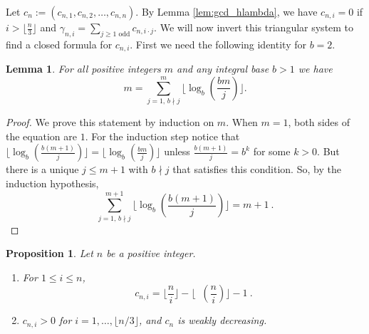 \documentclass[reqno]{amsart}
\def\e{\gamma}
\DeclareMathOperator{\lb}{\log_2}
\newtheorem{proposition}[theorem]{Proposition}
\newtheorem{lemma}[theorem]{Lemma}
\theoremstyle{definition}
\begin{document}
Let $c_n:=(c_{n,1},c_{n,2},\ldots,c_{n,n})$. By Lemma \ref{lem:gcd_hlambda}, we have  $c_{n,i}=0$ if $i>\lfloor \frac{n}{3}\rfloor$ and $\e_{n,i}=\sum_{j\geq 1 \textrm{ odd}}c_{n,i\cdot j}$. We will now invert this triangular system to find a  closed formula for $c_{n,i}$. First we  need the following identity for $b=2$. 




\begin{lemma} \label{lemma:m/2}For all positive integers $m$ and any integral base $b>1$ we have
    \[m=\sum_{{j=1,\, b\nmid j}}^m\lfloor\log_b(\frac{bm}{j})\rfloor.\]
\end{lemma}
\begin{proof}
 We prove this statement  by induction on $m$. When $m=1$, both sides of the equation are $1$. For the induction step  notice that
 $\lfloor\log_b(\frac{b(m+1)}{j})\rfloor=\lfloor\log_b(\frac{bm}{j})\rfloor$ unless $\frac{b(m+1)}{j}=b^k$ for some $k>0$. But there is a unique $j\leq m+1$ with $b\nmid j$ that satisfies this condition. So, by the induction hypothesis,
 \[\sum_{{j=1, \,  b\nmid j}}^{m+1}\lfloor\log_b(\frac{b(m+1)}{j})\rfloor=m+1\:.\]
\end{proof}
\begin{proposition} \label{g-exp} Let $n$ be a positive integer. 
\begin{enumerate}[label=(\alph*)]
\item\label{expo_explicit} For  $1\leq i\leq n$, 
\[c_{n,i}=\lfloor\frac{n}{i}\rfloor-\lfloor\lb(\frac{n}{i})\rfloor-1\:.\]
\item\label{cni1} $c_{n,i}>0$ for $i=1,\ldots,\lfloor n/3 \rfloor$,  and $c_n$ is weakly decreasing.
\end{enumerate}
\end{proposition}
\end{document}
